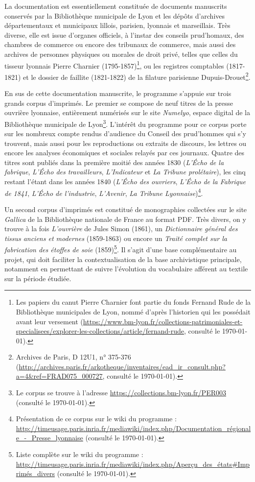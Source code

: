 La documentation est essentiellement constituée de documents manuscrits conservés par la Bibliothèque municipale de Lyon et les dépôts d'archives départementaux et municipaux lillois, parisien, lyonnais et marseillais. Très diverse, elle est issue d'organes officiels, à l'instar des conseils prud'homaux, des chambres de commerce ou encore des tribunaux de commerce, mais aussi des archives de personnes physiques ou morales de droit privé, telles que celles du tisseur lyonnais Pierre Charnier (1795-1857)\footnote{Les papiers du canut Pierre Charnier font partie du fonds \og Fernand Rude \fg{} de la Bibliothèque municipales de Lyon, nommé d'après l'historien qui les possédait avant leur versement (\url{https://www.bm-lyon.fr/collections-patrimoniales-et-specialisees/explorer-les-collections/article/fernand-rude}, consulté le \today).}, ou les registres comptables (1817-1821) et le dossier de faillite (1821-1822) de la filature parisienne Dupuis-Drouet\footnote{Archives de Paris, D 12U1, n° 375-376 (\url{http://archives.paris.fr/arkotheque/inventaires/ead_ir_consult.php?a=4&ref=FRAD075_000727}, consulté le \today).}.

En sus de cette documentation manuscrite, le programme \timeus{} s'appuie sur trois grands corpus d'imprimés. Le premier se compose de neuf titres de la presse ouvrière lyonnaise, entièrement numérisés sur le site \textit{Numelyo}, espace digital de la Bibliothèque municipale de  Lyon\footnote{ Le corpus se trouve à l'adresse \url{https://collections.bm-lyon.fr/PER003} (consulté le \today).}. L'intérêt du programme pour ce corpus porte sur les nombreux compte rendus d'audience du Conseil des prud'hommes qui s'y trouvent, mais aussi pour les reproductions ou extraits de discours, les lettres ou encore les analyses économiques et sociales relayés par ces journaux. Quatre des titres sont publiés dans la première moitié des années 1830 (\textit{L'Écho de la fabrique}, \textit{L’Écho des travailleurs}, \textit{L'Indicateur} et \textit{La Tribune prolétaire}), les cinq restant l'étant dans les années 1840 (\textit{L’Écho des ouvriers}, \textit{L’Écho de la Fabrique de 1841}, \textit{L’Écho de l'industrie}, \textit{L'Avenir}, \textit{La Tribune Lyonnaise})\footnote{Présentation de ce corpus sur le wiki du programme : \url{http://timeusage.paris.inria.fr/mediawiki/index.php/Documentation_régionale_-_Presse_lyonnaise} (consulté le \today).}.

Un second corpus d'imprimés est constitué de monographies collectées sur le site \textit{Gallica} de la Bibliothèque nationale de France au format PDF. Très divers, on y trouve à la fois \textit{L'ouvrière} de Jules Simon (1861), un \textit{Dictionnaire général des tissus anciens et modernes} (1859-1863) ou encore un \textit{Traité complet sur la fabrication des étoffes de soie} (1859)\footnote{Liste complète sur le wiki du programme : \url{http://timeusage.paris.inria.fr/mediawiki/index.php/Aperçu_des_états\#Imprimés_divers} (consulté le \today).}. Il s'agit d'une base complémentaire au projet, qui doit faciliter la contextualisation de la base archivistique principale, notamment en permettant de suivre l'évolution du  vocabulaire afférent au textile sur la période étudiée.

